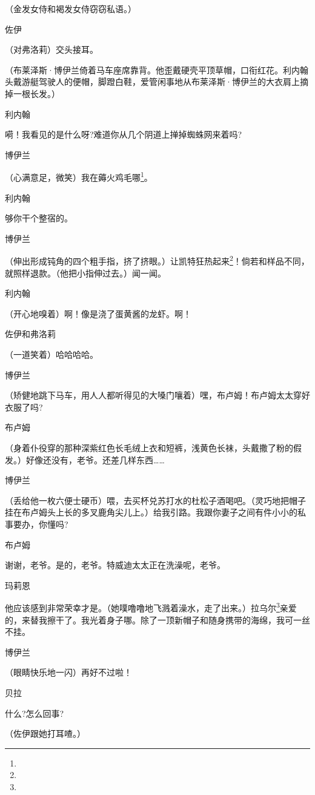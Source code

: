 \par （金发女侍和褐发女侍窃窃私语。）
\par 佐伊
\par （对弗洛莉）交头接耳。
\par （布莱泽斯·博伊兰倚着马车座席靠背。他歪戴硬壳平顶草帽，口衔红花。利内翰头戴游艇驾驶人的便帽，脚蹬白鞋，爱管闲事地从布莱泽斯·博伊兰的大衣肩上摘掉一根长发。）
\par 利内翰
\par 嗬！我看见的是什么呀?难道你从几个阴道上掸掉蜘蛛网来着吗?
\par 博伊兰
\par （心满意足，微笑）我在薅火鸡毛哪\footnote{}。
\par 利内翰
\par 够你干个整宿的。
\par 博伊兰
\par （伸出形成钝角的四个粗手指，挤了挤眼。）让凯特狂热起来\footnote{}！倘若和样品不同，就照样退款。（他把小指伸过去。）闻一闻。
\par 利内翰
\par （开心地嗅着）啊！像是浇了蛋黄酱的龙虾。啊！
\par 佐伊和弗洛莉
\par （一道笑着）哈哈哈哈。
\par 博伊兰
\par （矫健地跳下马车，用人人都听得见的大嗓门嚷着）嘿，布卢姆！布卢姆太太穿好衣服了吗?
\par 布卢姆
\par （身着仆役穿的那种深紫红色长毛绒上衣和短裤，浅黄色长袜，头戴撒了粉的假发。）好像还没有，老爷。还差几样东西……
\par 博伊兰
\par （丢给他一枚六便士硬币）喂，去买杯兑苏打水的杜松子酒喝吧。（灵巧地把帽子挂在布卢姆头上长的多叉鹿角尖儿上。）给我引路。我跟你妻子之间有件小小的私事要办，你懂吗?
\par 布卢姆
\par 谢谢，老爷。是的，老爷。特威迪太太正在洗澡呢，老爷。
\par 玛莉恩
\par 他应该感到非常荣幸才是。（她噗噜噜地飞溅着澡水，走了出来。）拉乌尔\footnote{}亲爱的，来替我擦干了。我光着身子哪。除了一顶新帽子和随身携带的海绵，我可一丝不挂。
\par 博伊兰
\par （眼睛快乐地一闪）再好不过啦！
\par 贝拉
\par 什么?怎么回事?
\par （佐伊跟她打耳喳。）
